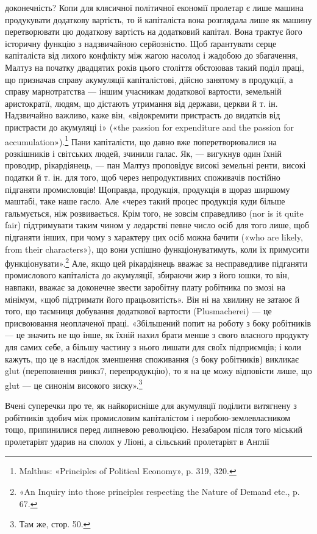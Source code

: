 \parcont{}  %
доконечність? Копи для клясичної політичної економії пролетар
є лише машина продукувати додаткову вартість, то
й капіталіста вона розглядала лише як машину перетворювати
цю додаткову вартість на додатковий капітал. Вона трактує
його історичну функцію з надзвичайною серйозністю. Щоб ґарантувати
серце капіталіста від лихого конфлікту між жагою
насолод і жадобою до збагачення, Малтуз на початку двадцятих
років цього століття обстоював такий поділ праці, що призначав
справу акумуляції капіталістові, дійсно занятому в продукції,
а справу марнотратства — іншим учасникам додаткової вартости,
земельній аристократії, людям, що дістають утримання від держави,
церкви й т. ін. Надзвичайно важливо, каже він, «відокремити
пристрасть до видатків від пристрасти до акумуляці і» («the
passion for expenditure and the passion for accumulation»).\footnote{
Malthus: «Principles of Political Economy», p. 319, 320.
}
Пани капіталісти, що давно вже поперетворювалися на розкішників
і світських людей, зчинили галас. Як, — вигукнув один
їхній проводир, рікардіянець, — пан Малтуз проповідує високі
земельні ренти, високі податки й т. ін. для того, щоб через непродуктивних
споживачів постійно підганяти промисловців! Щоправда,
продукція, продукція в щораз ширшому маштабі, таке
наше гасло. Але «через такий процес продукція куди більше
гальмується, ніж розвивається. Крім того, не зовсім справедливо
(nor is it quite fair) підтримувати таким чином у ледарстві певне
число осіб для того лише, щоб підганяти інших, при чому з характеру
цих осіб можна бачити («who are likely, from their characters»),
що вони успішно функціонуватимуть, коли їх примусити
функціонувати».\footnote{
«An Inquiry into those principles respecting the Nature of Demand
etc., p. 67.
} Але, якщо цей рікардіянець вважає за несправедливе
підганяти промислового капіталіста до акумуляції,
збираючи жир з його юшки, то він, навпаки, вважає за доконечне
звести заробітну плату робітника по змозі на мінімум,
«щоб підтримати його працьовитість». Він ні на хвилину не
затаює й того, що таємниця добування додаткової вартости
(Plusmacherei) — це присвоювання неоплаченої праці. «Збільшений
попит на роботу з боку робітників — це значить не що
інше, як їхній нахил брати менше з свого власного продукту для
самих себе, а більшу частину з нього лишати для своїх підприємців;
і коли кажуть, що це в наслідок зменшення споживання
(з боку робітників) викликає glut (переповнення ринкз7, перепродукцію),
то я на це можу відповісти лише, що glut — це синонім
високого зиску».\footnote{
Там же, стор. 50.
}

Вчені суперечки про те, як найкорисніше для акумуляції
поділити витягнену з робітників здобич між промисловим капіталістом
і неробою-землевласником тощо, припинилися перед
липневою революцією. Незабаром після того міський пролетаріят
ударив на сполох у Ліоні, а сільський пролетаріят в Англії
\parbreak{}  %
